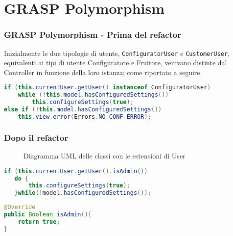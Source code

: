 \section{GRASP Polymorphism}
\begin{frame}[fragile]
    \frametitle{GRASP Polymorphism - Prima del refactor}

    Inizialmente le due tipologie di utente, \texttt{ConfiguratorUser} e \texttt{CustomerUser}, equivalenti ai tipi di utente Configuratore e Fruitore, venivano distinte dal Controller in funzione della loro istanza; come riportato a seguire.

    \lstset{style=java}
    \begin{lstlisting}[language=java, caption={v5 commit 34c1a67}]
if (this.currentUser.getUser() instanceof ConfiguratorUser)
    while (!this.model.hasConfiguredSettings())
        this.configureSettings(true);
else if (!this.model.hasConfiguredSettings())
    this.view.error(Errors.NO_CONF_ERROR);
    \end{lstlisting}

\end{frame}

\begin{frame}[fragile]
    \frametitle{Dopo il refactor}

    \begin{minipage}{.38\textwidth}
        \begin{figure}
            \centering
            \caption{Diagramma UML delle classi con le estensioni di User}
        \end{figure}
    \end{minipage}
    \hfill
    \begin{minipage}{.58\textwidth}
        \lstset{style=java}
        \begin{lstlisting}[language=java, caption={Codice refactorato in Controller}]
if (this.currentUser.getUser().isAdmin())
   do {
       this.configureSettings(true);
   }while(!model.hasConfiguredSettings());
        \end{lstlisting}

        \begin{lstlisting}[language=java, caption={Utente configuratore è admin}]
@Override
public Boolean isAdmin(){
    return true;
}
        \end{lstlisting}
    \end{minipage}

\end{frame}